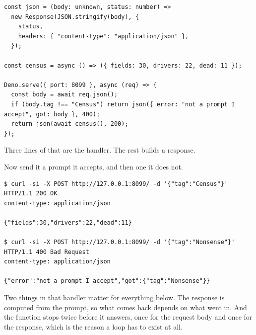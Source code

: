 \documentclass[11pt,a4paper]{article}
\begin{document}
\begin{lstlisting}[language=TS]
const json = (body: unknown, status: number) =>
  new Response(JSON.stringify(body), {
    status,
    headers: { "content-type": "application/json" },
  });

const census = async () => ({ fields: 30, drivers: 22, dead: 11 });

Deno.serve({ port: 8099 }, async (req) => {
  const body = await req.json();
  if (body.tag !== "Census") return json({ error: "not a prompt I accept", got: body }, 400);
  return json(await census(), 200);
});
\end{lstlisting}

Three lines of that are the handler. The rest builds a response.

Now send it a prompt it accepts, and then one it does not.

\begin{lstlisting}[language=SH]
$ curl -si -X POST http://127.0.0.1:8099/ -d '{"tag":"Census"}'
HTTP/1.1 200 OK
content-type: application/json

{"fields":30,"drivers":22,"dead":11}

$ curl -si -X POST http://127.0.0.1:8099/ -d '{"tag":"Nonsense"}'
HTTP/1.1 400 Bad Request
content-type: application/json

{"error":"not a prompt I accept","got":{"tag":"Nonsense"}}
\end{lstlisting}

Two things in that handler matter for everything below. The response is computed from the prompt, so
what comes back depends on what went in. And the function stops twice before it answers, once for
the request body and once for the response, which is the reason a loop has to exist at all.

\newpage
\end{document}
